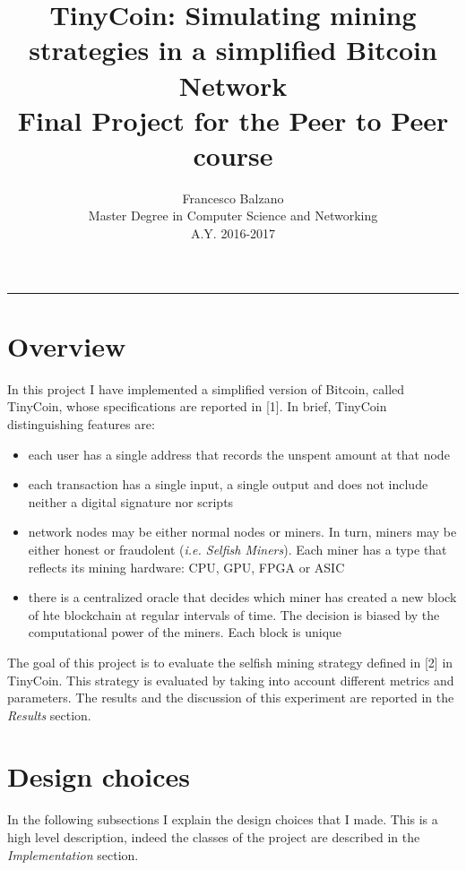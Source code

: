 \documentclass{article}
\title{ \textbf {\vspace{0.5cm}\Huge TinyCoin: Simulating mining strategies in a simplified Bitcoin Network\\ \vspace{0.5cm}}
 Final Project for the Peer to Peer course \vspace{1.0cm}\\}
\date{\vspace{1.7cm}}
\author{ \Large Francesco Balzano \vspace{0.3cm}\\ 
\Large Master Degree in Computer Science and Networking \vspace{0.4cm} \\
\Large A.Y. 2016-2017 
}
\begin{document}
  \maketitle
  \noindent\rule{18cm}{0.4pt}
  \tableofcontents
  \newpage

\clearpage
\setcounter{page}{2}
  
\section{Overview}  
In this project I have implemented a simplified version of Bitcoin, called TinyCoin, whose specifications are reported in [1]. In brief, TinyCoin distinguishing features are:
\begin{itemize}
\item each user has a single address that records the unspent amount at that node
\item each transaction has a single input, a single output and does not include neither a digital signature nor scripts
\item network nodes may be either normal nodes or miners. In turn, miners may be either honest or fraudolent (\textit{i.e. Selfish Miners}). Each miner has a type that reflects its mining hardware: CPU, GPU, FPGA or ASIC
\item there is a centralized oracle that decides which miner has created a new block of hte blockchain at regular intervals of time. The decision is biased by the computational power of the miners. Each block is unique \\
\end{itemize}
The goal of this project is to evaluate the selfish mining strategy defined in [2] in TinyCoin. This strategy is evaluated by taking into account different metrics and parameters. The results and the discussion of this experiment are reported in the \textit{Results} section.

\section{Design choices}
In the following subsections I explain the design choices that I made. This is a high level description, indeed the classes of the project are described in the \textit{Implementation} section.
\end{document}
